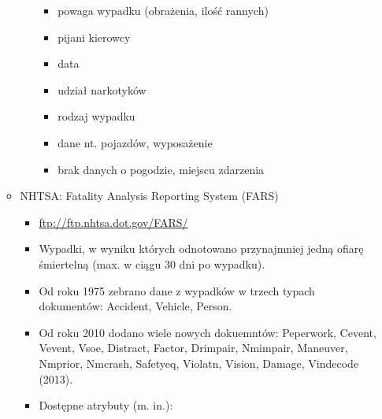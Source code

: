 \begin{enumerate}
\begin{itemize}
\begin{itemize}
      \begin{itemize}
      \itemsep-14pt\parskip0pt
      \item
        powaga wypadku (obrażenia, ilość rannych)\\
      \item
        pijani kierowcy\\
      \item
        data\\
      \item
        udział narkotyków\\
      \item
        rodzaj wypadku\\
      \item
        dane nt. pojazdów, wyposażenie\\
      \item
        brak danych o pogodzie, miejscu zdarzenia\\
      \end{itemize}
    \end{itemize}
  \item
    NHTSA: Fatality Analysis Reporting System (FARS) \cite{fars}

    \begin{itemize}
    \item
      \url{ftp://ftp.nhtsa.dot.gov/FARS/}\\
    \item
      Wypadki, w wyniku których odnotowano przynajmniej jedną ofiarę
      śmiertelną (max. w ciągu 30 dni po wypadku).\\
    \item
      Od roku 1975 zebrano dane z wypadków w trzech typach dokumentów:
      Accident, Vehicle, Person.\\
    \item
      Od roku 2010 dodano wiele nowych dokuemntów: Peperwork, Cevent,
      Vevent, Vsoe, Distract, Factor, Drimpair, Nmimpair, Maneuver,
      Nmprior, Nmcrash, Safetyeq, Violatn, Vision, Damage, Vindecode
      (2013).\\
    \item
      Dostępne atrybuty (m. in.):


\end{itemize}
\end{itemize}
\end{enumerate}
